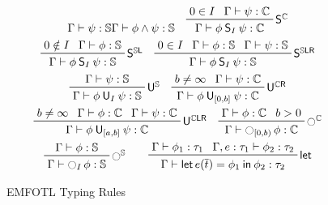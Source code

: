 \begin{figure}
\begin{gather*}
            {\Gamma\vdash \psi : \Sup}
            {\Gamma \vdash \phi \wedge \psi : \Sup}
            \quad
        \prftree[r]
            {$\Since^\Cau$}
            {0 \in I}
            {\Gamma \vdash \psi : \Cau}
            {\Gamma \vdash \phi \Since_I \psi : \Cau}
            \\
        \prftree[r]
            {$\Since^{\Sup\Left}$}
            {0 \notin I}
            {\Gamma \vdash \phi : \Sup}
            {\Gamma \vdash \phi \Since_{I} \psi : \Sup}
            \quad
        \prftree[r]
            {$\Since^{\Sup\LeftRight}$}
            {0 \in I}
            {\Gamma \vdash \phi : \Sup}
            {\Gamma \vdash \psi : \Sup}
            {\Gamma \vdash \phi \Since_I \psi : \Sup}
            \\
        \prftree[r]
            {$\UUntil^\Sup$}
            {\Gamma \vdash \psi : \Sup}
            {\Gamma \vdash \phi \UUntil_I \psi : \Sup}
            \quad
        \prftree[r]
            {$\UUntil^{\Cau\Right}$}
            {b \neq \infty}
            {\Gamma \vdash \psi : \Cau}
            {\Gamma \vdash \phi \UUntil_{[0,b]} \psi : \Cau}
            \\
        \prftree[r]
            {$\UUntil^{\Cau\LeftRight}$}
            {b \neq \infty}
            {\Gamma\vdash \phi : \Cau}
            {\Gamma \vdash \psi : \Cau}
            {\Gamma \vdash \phi \UUntil_{[a,b]} \psi : \Cau}
            \quad
        \prftree[r]
            {$\Next^\Cau$}
            {\Gamma \vdash \phi : \Cau}
            {b > 0}
            {\Gamma \vdash \Next_{[0,b)} \phi : \Cau}
            \\
        \prftree[r]
            {$\Next^\Sup$}
            {\Gamma \vdash \phi : \Sup}
            {\Gamma \vdash \Next_I \phi : \Sup}
        \qquad
        \prftree[r]
            {$\mathsf{let}$}
            {\Gamma \vdash \phi_1 : \tau_1}
            {\Gamma, e : \tau_1 \vdash \phi_2 : \tau_2}
            {\Gamma \vdash \LLet{e(\overline{t})}{\phi_1}{\phi_2} : \tau_2}
    \end{gather*}
    \vspace{-2em}
    \caption{EMFOTL Typing Rules \label{fig:emfotl-typing-rules}}
\end{figure}


